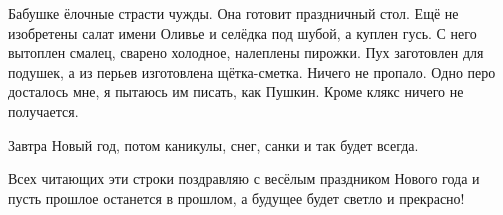 Бабушке ёлочные страсти чужды. Она готовит праздничный стол. Ещё не изобретены
салат имени Оливье и селёдка под шубой, а куплен гусь. С него вытоплен  смалец,
сварено холодное,  налеплены пирожки. Пух заготовлен для подушек, а из перьев
изготовлена щётка\hyp сметка. Ничего не пропало. Одно перо досталось мне, я
пытаюсь им писать, как Пушкин. Кроме клякс ничего не получается. 

Завтра Новый год, потом каникулы, снег, санки и так будет всегда.

Всех читающих эти строки поздравляю с весёлым праздником Нового года и пусть
прошлое останется в прошлом, а будущее будет светло и прекрасно!

